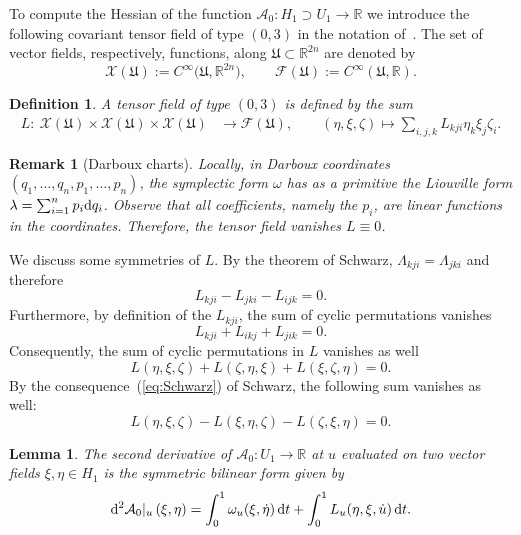 \documentclass[pdftex]{sigma}
\numberwithin{equation}{section}
\newtheorem{Lemma}[Theorem]{Lemma}
\newtheorem{Definition}[Theorem]{Definition}
\newtheorem{Remark}[Theorem]{Remark}
\newcommand{\R}{{\mathbb{R}}}
\newcommand{\Aa}{{\mathcal{A}}} %
\newcommand{\Ff}{{\mathcal{F}}}
\newcommand{\Xx}{{\mathcal{X}}}
\newcommand{\1}{{{\mathchoice {\rm 1\mskip-4mu l} {\rm 1\mskip-4mu l}
{\rm 1\mskip-4.5mu l} {\rm 1\mskip-5mu l}}}}
\begin{document}
To compute the Hessian of the function
$\Aa_0\colon H_1\supset U_1\to\R$
we introduce the following covariant tensor field of type $(0,3)$
in the notation of~\cite[Section~2]{oneill:1983a}.
The set of vector fields, respectively, functions, along
$\mathfrak{U}\subset\R^{2n}$ are denoted by
\[
 \Xx(\mathfrak{U}):=C^\infty\bigl(\mathfrak{U},\R^{2n}\bigr)
 ,\qquad
 \Ff(\mathfrak{U}):=C^\infty(\mathfrak{U},\R) .
\]

\begin{Definition}
A tensor field of type $(0,3)$ is defined by the sum
\begin{equation*}%
\begin{split}
 L\colon\ \Xx(\mathfrak{U}) \times \Xx(\mathfrak{U})\times
 \Xx(\mathfrak{U})
 &\to \Ff(\mathfrak{U}),
 \qquad
 (\eta,\xi,\zeta)
 \mapsto
 \sum_{i,j,k} L_{kji} \eta_k\xi_j \zeta_i .
\end{split}
\end{equation*}
\end{Definition}

\begin{Remark}[Darboux charts]
Locally, in Darboux coordinates $(q_1,\dots,q_n,p_1,\dots, p_n)$,
the symplectic form $\omega$ has as a primitive the Liouville form
$\lambda=\sum_{i=1}^n p_i {\rm d}q_i$.
Observe that all coefficients, namely the $p_i$, are linear functions
in the coordinates. Therefore, the tensor field vanishes $L\equiv 0$.
\end{Remark}

We discuss some symmetries of $L$.
By the theorem of Schwarz,
$
 \Lambda_{kji}=\Lambda_{jki}
$
and therefore
\begin{equation}\label{eq:Schwarz}
 L_{kji}-L_{jki}-L_{ijk}=0 .
\end{equation}
Furthermore, by definition of the $L_{kji}$, the sum of cyclic
permutations vanishes
\[
 L_{kji}+L_{ikj}+L_{jik}=0 .
\]
Consequently, the sum of cyclic permutations in $L$ vanishes as well
\begin{equation*}%
 L(\eta,\xi,\zeta)+L(\zeta,\eta,\xi)
 +L(\xi,\zeta,\eta)
 =0 .
\end{equation*}
By the consequence~(\ref{eq:Schwarz}) of Schwarz,
the following sum vanishes as well:
\begin{equation*}%
 L(\eta,\xi,\zeta)-L(\xi,\eta,\zeta)
 -L(\zeta,\xi,\eta)
 =0 .
\end{equation*}

\begin{Lemma}\label{le:2nd-deriv}
The second derivative of $\Aa_0\colon U_1\to\R$
at $u$ evaluated on two vector fields
$\xi,\eta\in H_1$ is the symmetric bilinear form given by
\begin{equation*}
\begin{split}
 {\rm d}^2\Aa_0|_u\left(\xi,\eta\right)
 = %
 \int_0^1 \omega_{u}(\xi,\dot\eta)\, {\rm d}t
 +\int_0^1 L_u(\eta,\xi,\dot u)\, {\rm d}t .
\end{split}
\end{equation*}
\end{Lemma}
\end{document}
